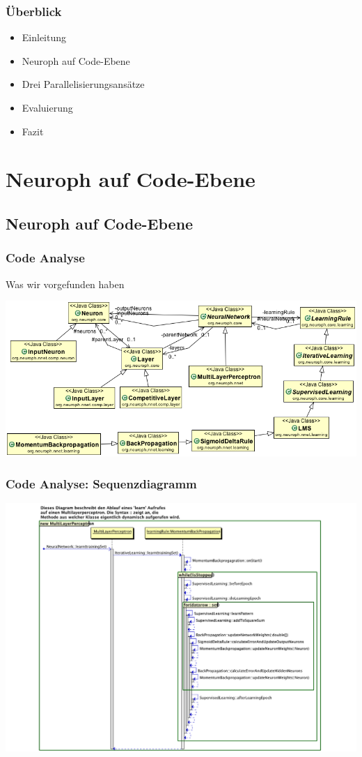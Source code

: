 \documentclass[18pt]{beamer}
\begin{document}
	\begin{frame}[c]\frametitle{Überblick}
		\begin{itemize}
		   \item Einleitung \checkmark
		   \item Neuroph auf Code-Ebene 
		   \item Drei Parallelisierungsansätze
		   \item Evaluierung
		   \item Fazit
		\end{itemize}
	\end{frame}
	
	\section{Neuroph auf Code-Ebene}
	\subsection{Neuroph auf Code-Ebene}
	\begin{frame}[c]\frametitle{Code Analyse}
		\begin{block}{Was wir vorgefunden haben}
			\begin{center}
				\includegraphics[scale=0.4]{images/Klassendiagramm.png}
			\end{center}
		\end{block}
	\end{frame}
	
	\begin{frame}[c]\frametitle{Code Analyse: Sequenzdiagramm}
			\begin{center}
			  \includegraphics[scale=0.4]{images/Learn.pdf} 
			\end{center}
	\end {frame}	
	
\end{document}

